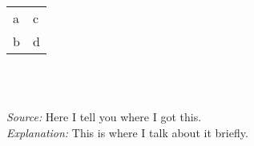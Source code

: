 \centering
\begin{tabularx}{0.5\textwidth}{Y Y}
    a   &   c\\
    b   &   d
\end{tabularx}
\\
\raggedright
\footnotesize
\emph{\\Source:} Here I tell you where I got this.\\
\emph{Explanation:} This is where I talk about it briefly.